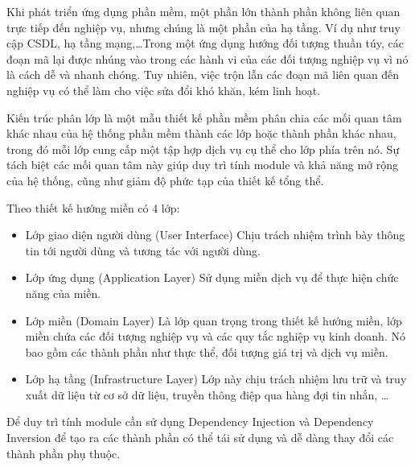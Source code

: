 

Khi phát triển ứng dụng phần mềm, một phần lớn thành phần không liên quan trực tiếp đến nghiệp vụ, nhưng chúng là một phần của hạ tầng. Ví dụ như truy cập CSDL, hạ tầng mạng,\dots Trong một ứng dụng hướng đối tượng thuần túy, các đoạn mã lại được nhúng vào trong các hành vi của các đối tượng nghiệp vụ vì nó là cách dễ và nhanh chóng. Tuy nhiên, việc trộn lẫn các đoạn mã liên quan đến nghiệp vụ có thể làm cho việc sửa đổi  khó khăn, kém linh hoạt. 

Kiến trúc phân    lớp là một mẫu thiết kế phần mềm phân chia các mối quan tâm khác nhau của hệ thống phần mềm thành các lớp hoặc thành phần khác nhau, trong đó mỗi lớp cung cấp một tập hợp dịch vụ cụ thể cho lớp phía trên nó. Sự tách biệt các mối quan tâm này giúp duy trì tính module và khả năng mở rộng của hệ thống, cũng như giảm độ phức tạp của thiết kế tổng thể.



Theo thiết kế hướng miền có 4 lớp:
\begin{itemize}
    \item Lớp giao diện người dùng (User Interface)
    Chịu trách nhiệm trình bày thông tin tới người   dùng và  tương tác với  người dùng.
    \item Lớp ứng dụng (Application Layer)
    Sử dụng  miền  dịch vụ   để  thực hiện chức năng của miền.
    \item Lớp miền (Domain Layer)
    Là lớp quan trọng trong  thiết kế hướng   miền,  lớp miền chứa các đối tượng nghiệp vụ và các quy tắc nghiệp vụ kinh doanh.  Nó bao gồm các thành phần như thực thể, đối tượng giá trị và dịch vụ miền.
    \item Lớp hạ tầng (Infrastructure Layer)
    Lớp này chịu trách nhiệm lưu trữ và truy xuất dữ liệu từ cơ sở dữ liệu, truyền thông điệp qua hàng đợi tin nhắn, \dots
\end{itemize}



\begin{example} Để duy trì tính module   cần sử dụng Dependency Injection và Dependency   Inversion  để   tạo   ra   các   thành   phần   có   thể   tái   sử   dụng   và   dễ   dàng   thay   đổi   các   thành   phần   phụ thuộc.
    
\end{example}
